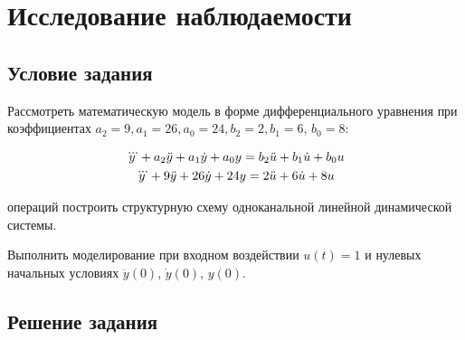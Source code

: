 \newpage
\label{ch:chap3}
\section{Исследование наблюдаемости} 
\subsection{Условие задания}

Рассмотреть математическую модель в форме дифференциального уравнения при коэффициентах 
$a_2 = 9, a_1 = 26, a_0 = 24, b_2 = 2, b_1 = 6$, $b _0 = 8$:

\begin{gather}
	\notag
	\dddot{y} + a_2\ddot{y} + a_1\dot{y} + a_0y = b_2\ddot{u} + b_1\dot{u} + b_0u\\
	\dddot{y} + 9\ddot{y} + 26\dot{y} + 24y = 2\ddot{u} + 6\dot{u} + 8u
\end{gather}

операций построить структурную схему одноканальной линейной динамической системы.

Выполнить моделирование при входном воздействии $u(t) = 1$ и нулевых начальных условиях 
$\ddot{y}(0)$, $\dot{y}(0)$, $y(0)$.

\subsection{Решение задания}

\endinput